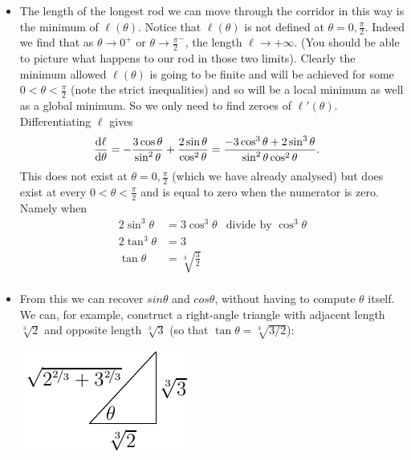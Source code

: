 \begin{eg}
\begin{itemize}
\item The length of the longest rod we can move through the corridor in this way is the
minimum of $\ell(\theta)$. Notice that $\ell(\theta)$ is not defined at $\theta = 0,
\frac{\pi}{2}$. Indeed we find that as $\theta \rightarrow 0^+$ or $\theta\rightarrow
\frac{\pi}{2}^-$, the length $\ell\rightarrow +\infty$. (You should be able to picture
what happens to our rod in those two limits). Clearly the minimum allowed $\ell(\theta)$
is going to be finite and will be achieved for some $0<\theta<\frac{\pi}{2}$ (note the
strict inequalities) and so will be a local minimum as well as a global minimum. So we
only need to find zeroes of $\ell'(\theta)$.
Differentiating $\ell$ gives
\begin{align*}
  \diff{\ell}{\theta} &= -\frac{3 \cos\theta}{\sin^2\theta} +
\frac{2\sin\theta}{\cos^2\theta}
  = \frac{-3\cos^3\theta  +2 \sin^3\theta}{\sin^2\theta
\cos^2\theta}.
\end{align*}
This does not exist at $\theta = 0, \frac{\pi}{2}$ (which we have already
analysed) but does exist at every $0 <\theta< \frac{\pi}{2}$ and is equal to zero when the
numerator is zero. Namely when
\begin{align*}
  2\sin^3\theta &= 3 \cos^3 \theta & \text{divide by $\cos^3 \theta$}\\
  2 \tan^3\theta &= 3 \\
  \tan\theta &= \sqrt[3]{\frac{3}{2}} \\
\end{align*}
\item
From this we can recover $sin\theta$ and  $cos\theta$, without having to compute $\theta$
itself. We can, for example, construct a right-angle triangle with adjacent length
$\sqrt[3]{2}$ and opposite length $\sqrt[3]{3}$ (so that $\tan\theta=\sqrt[3]{3/2}$):
\begin{efig}
 \begin{center}
  \includegraphics{triangleCor}

\end{center}
\end{efig}
\end{itemize}
\end{eg}
